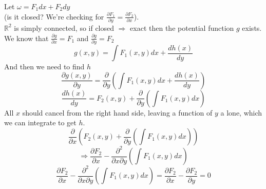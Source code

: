 \documentclass[12pt]{article}
\theoremstyle{plain}
\theoremstyle{definition}
\begin{document}
	Let $\omega = F_1 dx + F_2 dy$\\
	(is it closed? We're checking for $\frac{\partial F_1}{\partial y} = \frac{\partial F_2}{\partial x}$).\\
	$\mathbb{R}^2$ is simply connected, so if closed $\Longrightarrow$ exact then the potential function $g$ exists.\\
	We know that $\frac{\partial g}{\partial x} = F_1$ and $\frac{\partial g}{\partial y} = F_2$
	$$g(x,y) = \int F_1 (x,y)dx + \frac{dh(x)}{dy}$$
	And then we need to find $h$
	$$\frac{\partial g(x,y)}{\partial y} = \frac{\partial}{\partial y}(\int F_1 (x,y)dx + \frac{dh(x)}{dy})$$
	$$\frac{dh(x)}{dy} = F_2 (x,y) + \frac{\partial}{\partial y}(\int F_1 (x,y)dx)$$
	All $x$ should cancel from the right hand side, leaving a function of $y$ a lone, which we can integrate to get $h$.
	$$\frac{\partial}{\partial x}(F_2 (x,y) + \frac{\partial}{\partial y}(\int F_1 (x,y)dx))$$
	$$\Longrightarrow \frac{\partial F_2}{\partial x} - \frac{\partial^2}{\partial x\partial y}  (\int F_1 (x,y)dx)$$
	$$\frac{\partial F_2}{\partial x} - \frac{\partial^2}{\partial x\partial y}  (\int F_1 (x,y)dx) = \frac{\partial F_2}{\partial x} - \frac{\partial F_2}{\partial y} = 0$$
\end{document}
